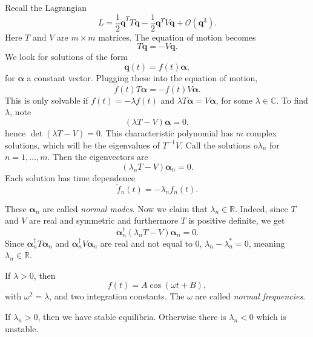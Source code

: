 \documentclass[12pt]{article}
\begin{document}
Recall the Lagrangian
\[
L = \frac{1}{2} \mathbf{\dot q}^{T} T \mathbf{\dot q} - \frac{1}{2} \mathbf{q}^{T} V \mathbf{q} + \mathcal{O}(\mathbf{q}^3).
\] 
Here $T$ and $V$ are $m \times m$ matrices. The equation of motion becomes
\[
T \mathbf{\ddot q} = - V \mathbf{q}.
\]
We look for solutions of the form
\[
\mathbf{q}(t) = f(t) \bm{\alpha},
\]
for $\bm{\alpha}$ a constant vector. Plugging these into the equation of motion,
\[
\ddot f(t) T \bm{\alpha} = -f(t) V \bm{\alpha}.
\]
This is only solvable if $\ddot f(t) = - \lambda f(t)$ and $\lambda T \bm{\alpha} = V \bm{\alpha}$, for some $\lambda \in \mathbb{C}$. To find $\lambda$, note
\[
	(\lambda T - V)\bm{\alpha} = 0,
\]
hence $\det(\lambda T - V) = 0$. This characteristic polynomial has $m$ complex solutions, which will be the eigenvalues of $T^{-1}V$. Call the solutions $o\lambda_n$ for $n = 1, \ldots, m$. Then the eigenvectors are
\[
	(\lambda_n T - V) \bm{\alpha}_n = 0.
\]
Each solution has time dependence
\[
\ddot f_n(t) = - \lambda_n f_n(t).
\]

These $\bm{\alpha}_n$ are called \emph{normal modes}. Now we claim that $\lambda_n \in \mathbb{R}$. Indeed, since $T$ and $V$ are real and symmetric and furthermore $T$ is positive definite, we get
\[
\bm{\alpha}_n^{\dagger}(\lambda_n T - V) \bm{\alpha}_n = 0.
\]
Since $\bm{\alpha}_n^{\dagger} T \bm{\alpha}_n$ and $\bm{\alpha}_n^{\dagger} V \bm{\alpha}_n$ are real and not equal to $0$, $\lambda_n - \lambda_n^{\ast} = 0$, meaning $\lambda_n \in \mathbb{R}$.

If $\lambda > 0$, then
\[
f(t) = A \cos(\omega t + B),
\]
with $\omega^2 = \lambda$, and two integration constants. The $\omega$ are called \emph{normal frequencies}.

If $\lambda_n > 0$, then we have stable equilibria. Otherwise there is $\lambda_n < 0$ which is unstable.
\end{document}
